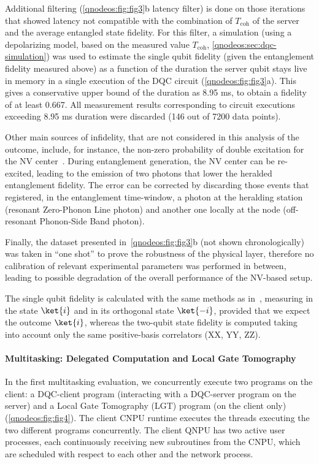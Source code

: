 Additional filtering (\cref{qnodeos:fig:fig3}b latency filter) is done on those iterations that showed latency not compatible with the combination of $T_{\text{coh}}$ of the server and the average entangled state fidelity. For this filter, a simulation (using a depolarizing model, based on the measured value $T_{\text{coh}}$, \cref{qnodeos:sec:dqc-simulation}) was used to estimate the single qubit fidelity (given the entanglement fidelity measured above) as a function of the duration the server qubit stays live in memory in a single execution of the DQC circuit (\cref{qnodeos:fig:fig3}a). This gives a conservative upper bound of the duration as 8.95 ms, to obtain a fidelity of at least 0.667. All measurement results corresponding to circuit executions exceeding 8.95 ms duration were discarded (146 out of 7200 data points). 

Other main sources of infidelity, that are not considered in this analysis of the outcome, include, for instance, the non-zero probability of double excitation for the NV center~\cite{hermans2023entangling}. During entanglement generation, the NV center can be re-excited, leading to the emission of two photons that lower the heralded entanglement fidelity. The error can be corrected by discarding those events that registered, in the entanglement time-window, a photon at the heralding station (resonant Zero-Phonon Line photon) and another one locally at the node (off-resonant Phonon-Side Band photon). 

Finally, the dataset presented in~\cref{qnodeos:fig:fig3}b (not shown chronologically) was taken in “one shot” to prove the robustness of the physical layer, therefore no calibration of relevant experimental parameters was performed in between, leading to possible degradation of the overall performance of the NV-based setup.

The single qubit fidelity is calculated with the same methods as in~\cite{iuliano2024qubit}, measuring in the state $\ket{i}$ and in its orthogonal state $\ket{-i}$, provided that we expect the outcome $\ket{i}$, whereas the two-qubit state fidelity is computed taking into account only the same positive-basis correlators (XX, YY, ZZ).

\paragraph{Multitasking: Delegated Computation and Local Gate Tomography}

In the first multitasking evaluation, we concurrently execute two programs on the client: a DQC-client program (interacting with a DQC-server program on the server) and a Local Gate Tomography (LGT) program (on the client only) (\cref{qnodeos:fig:fig4}). The client CNPU runtime executes the threads executing the two different programs concurrently. The client QNPU has two active user processes, each continuously receiving new subroutines from the CNPU, which are scheduled with respect to each other and the network process.

